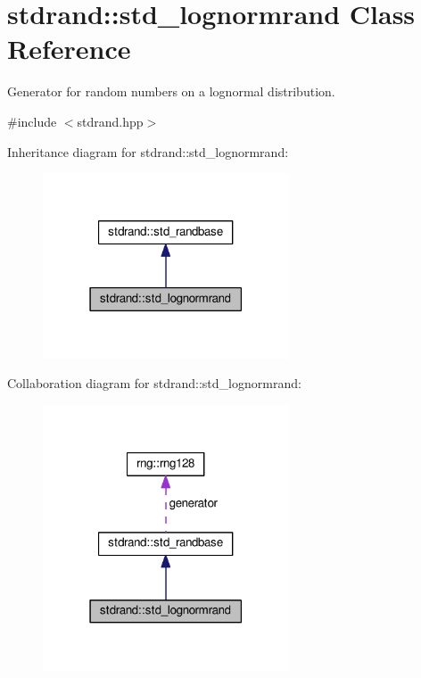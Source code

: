 \hypertarget{classstdrand_1_1std__lognormrand}{}\section{stdrand\+:\+:std\+\_\+lognormrand Class Reference}
\label{classstdrand_1_1std__lognormrand}


Generator for random numbers on a lognormal distribution.  




{\ttfamily \#include $<$stdrand.\+hpp$>$}



Inheritance diagram for stdrand\+:\+:std\+\_\+lognormrand\+:\nopagebreak
\begin{figure}[H]
\begin{center}
\leavevmode
\includegraphics[width=207pt]{d2/deb/classstdrand_1_1std__lognormrand__inherit__graph}
\end{center}
\end{figure}


Collaboration diagram for stdrand\+:\+:std\+\_\+lognormrand\+:\nopagebreak
\begin{figure}[H]
\begin{center}
\leavevmode
\includegraphics[width=207pt]{d1/d02/classstdrand_1_1std__lognormrand__coll__graph}
\end{center}
\end{figure}
